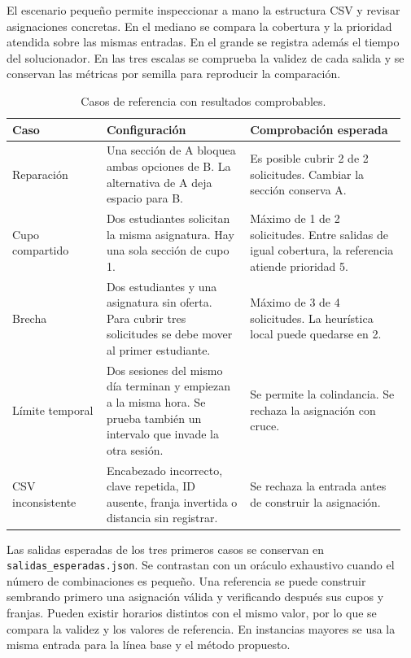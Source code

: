 \documentclass[11pt]{article}
\numberwithin{equation}{section}
\numberwithin{figure}{section}
\numberwithin{table}{section}
\theoremstyle{definition}
\begin{document}
El escenario pequeño permite inspeccionar a mano la estructura CSV y revisar
asignaciones concretas. En el mediano se compara la cobertura y la prioridad
atendida sobre las mismas entradas. En el grande se registra además el tiempo
del solucionador. En las tres escalas se comprueba la validez de cada salida
y se conservan las métricas por semilla para reproducir la comparación.

\begin{table}[H]
\centering
\caption{Casos de referencia con resultados comprobables.}
\small
\begin{tabular}{@{}p{0.23\linewidth}p{0.35\linewidth}p{0.38\linewidth}@{}}
\toprule
\textbf{Caso} & \textbf{Configuración} & \textbf{Comprobación esperada} \\
\midrule
Reparación & Una sección de A bloquea ambas opciones de B.
La alternativa de A deja espacio para B. &
Es posible cubrir 2 de 2 solicitudes. Cambiar la sección conserva A. \\
Cupo compartido & Dos estudiantes solicitan la misma asignatura.
Hay una sola sección de cupo 1. &
Máximo de 1 de 2 solicitudes. Entre salidas de igual cobertura,
la referencia atiende prioridad 5. \\
Brecha & Dos estudiantes y una asignatura sin oferta.
Para cubrir tres solicitudes se debe mover al primer estudiante. &
Máximo de 3 de 4 solicitudes. La heurística local puede quedarse en 2. \\
Límite temporal & Dos sesiones del mismo día terminan y empiezan a la
misma hora. Se prueba también un intervalo que invade la otra sesión. &
Se permite la colindancia. Se rechaza la asignación con cruce. \\
CSV inconsistente & Encabezado incorrecto, clave repetida, ID ausente,
franja invertida o distancia sin registrar. &
Se rechaza la entrada antes de construir la asignación. \\
\bottomrule
\end{tabular}
\end{table}

Las salidas esperadas de los tres primeros casos se conservan en
\texttt{salidas\_esperadas.json}. Se contrastan con un oráculo exhaustivo
cuando el número de combinaciones es pequeño. Una referencia se puede construir
sembrando primero una asignación válida y verificando después sus cupos y
franjas. Pueden existir horarios distintos con el mismo valor, por lo que se
compara la validez y los valores de referencia. En instancias mayores se usa
la misma entrada para la línea base y el método propuesto.
\end{document}
